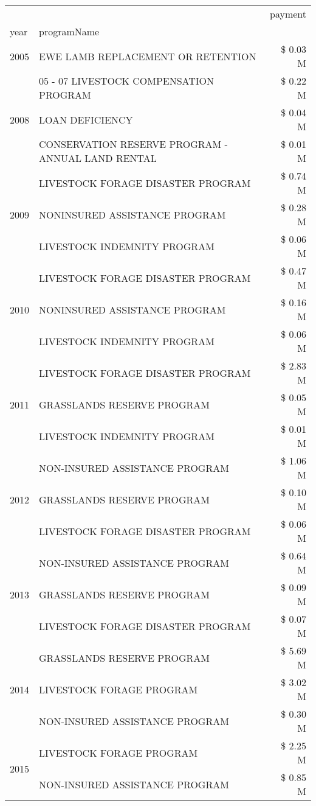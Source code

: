 \begin{tabular}{llr}
\toprule
 &  & payment \\
year & programName &  \\
\midrule
2005 & EWE LAMB REPLACEMENT OR RETENTION & \$ 0.03 M \\
\cline{1-3}
\multirow[t]{3}{*}{2008} & 05 - 07 LIVESTOCK COMPENSATION PROGRAM & \$ 0.22 M \\
 & LOAN DEFICIENCY & \$ 0.04 M \\
 & CONSERVATION RESERVE PROGRAM - ANNUAL LAND RENTAL & \$ 0.01 M \\
\cline{1-3}
\multirow[t]{3}{*}{2009} & LIVESTOCK FORAGE DISASTER  PROGRAM & \$ 0.74 M \\
 & NONINSURED ASSISTANCE PROGRAM & \$ 0.28 M \\
 & LIVESTOCK INDEMNITY PROGRAM & \$ 0.06 M \\
\cline{1-3}
\multirow[t]{3}{*}{2010} & LIVESTOCK FORAGE DISASTER PROGRAM & \$ 0.47 M \\
 & NONINSURED ASSISTANCE PROGRAM & \$ 0.16 M \\
 & LIVESTOCK INDEMNITY PROGRAM & \$ 0.06 M \\
\cline{1-3}
\multirow[t]{3}{*}{2011} & LIVESTOCK FORAGE DISASTER PROGRAM & \$ 2.83 M \\
 & GRASSLANDS RESERVE PROGRAM & \$ 0.05 M \\
 & LIVESTOCK INDEMNITY PROGRAM & \$ 0.01 M \\
\cline{1-3}
\multirow[t]{3}{*}{2012} & NON-INSURED ASSISTANCE PROGRAM & \$ 1.06 M \\
 & GRASSLANDS RESERVE PROGRAM & \$ 0.10 M \\
 & LIVESTOCK FORAGE DISASTER PROGRAM & \$ 0.06 M \\
\cline{1-3}
\multirow[t]{3}{*}{2013} & NON-INSURED ASSISTANCE PROGRAM & \$ 0.64 M \\
 & GRASSLANDS RESERVE PROGRAM & \$ 0.09 M \\
 & LIVESTOCK FORAGE DISASTER PROGRAM & \$ 0.07 M \\
\cline{1-3}
\multirow[t]{3}{*}{2014} & GRASSLANDS RESERVE PROGRAM & \$ 5.69 M \\
 & LIVESTOCK FORAGE PROGRAM & \$ 3.02 M \\
 & NON-INSURED ASSISTANCE PROGRAM & \$ 0.30 M \\
\cline{1-3}
\multirow[t]{3}{*}{2015} & LIVESTOCK FORAGE PROGRAM & \$ 2.25 M \\
 & NON-INSURED ASSISTANCE PROGRAM & \$ 0.85 M \\

\end{tabular}
